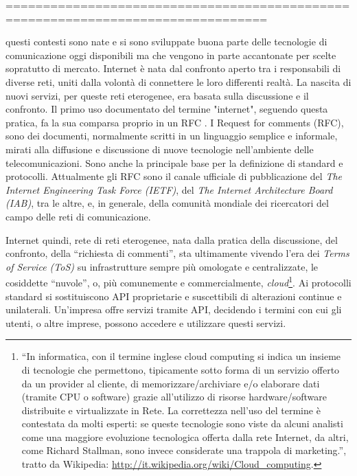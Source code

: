  
=================================================================================


questi contesti sono nate e si sono sviluppate buona parte delle
tecnologie di comunicazione oggi disponibili ma che vengono in parte
accantonate per scelte sopratutto di mercato. Internet è nata dal
confronto aperto tra i responsabili di diverse reti, uniti dalla
volontà di connettere le loro differenti realtà. La nascita di nuovi
servizi, per queste reti eterogenee, era basata sulla discussione e il
confronto. Il primo uso documentato del termine "internet", seguendo
questa pratica, fa la sua comparsa proprio in un RFC \citep{RFC675}. I
Request for comments (RFC), sono dei documenti, normalmente scritti in
un linguaggio semplice e informale, mirati alla diffusione e
discussione di nuove tecnologie nell'ambiente delle
telecomunicazioni. Sono anche la principale base per la definizione di
standard e protocolli. Attualmente gli RFC sono il canale ufficiale di
pubblicazione del \emph{The Internet Engineering Task Force (IETF)},
del \emph{The Internet Architecture Board (IAB)}, tra le altre, e, in
generale, della comunità mondiale dei ricercatori del campo delle reti
di comunicazione.

Internet quindi, rete di reti eterogenee, nata dalla pratica della
discussione, del confronto, della ``richiesta di commenti'', sta
ultimamente vivendo l'era dei \emph{Terms of Service (ToS)} su
infrastrutture sempre più omologate e centralizzate, le cosiddette
``nuvole'', o, più comunemente e commercialmente,
\emph{cloud}\footnote{``In informatica, con il termine inglese cloud
  computing si indica un insieme di tecnologie che permettono,
  tipicamente sotto forma di un servizio offerto da un provider al
  cliente, di memorizzare/archiviare e/o elaborare dati (tramite CPU o
  software) grazie all'utilizzo di risorse hardware/software
  distribuite e virtualizzate in Rete.  La correttezza nell'uso del
  termine è contestata da molti esperti: se queste tecnologie sono
  viste da alcuni analisti come una maggiore evoluzione tecnologica
  offerta dalla rete Internet, da altri, come Richard Stallman, sono
  invece considerate una trappola di marketing.'', tratto da
  Wikipedia: \url{http://it.wikipedia.org/wiki/Cloud_computing}.}. Ai
protocolli standard si sostituiscono API proprietarie e suscettibili
di alterazioni continue e unilaterali. Un'impresa offre servizi
tramite API, decidendo i termini con cui gli utenti, o altre imprese,
possono accedere e utilizzare questi servizi.

